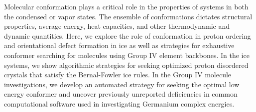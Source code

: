 Molecular conformation plays a critical role in the properties of systems in both the condensed or vapor states. 
The ensemble of conformations dictates structural properties, average energy, heat capacities, and other thermodynamic and dynamic quantities. 
Here, we explore the role of conformation in proton ordering and orientational defect formation in ice as well as strategies for exhaustive conformer searching for molecules using Group IV element backbones. 
In the ice systems, we show algorithmic strategies for seeking optimized proton disordered crystals that satisfy the Bernal-Fowler ice rules. 
In the Group IV molecule investigations, we develop an automated strategy for seeking the optimal low energy conformer and uncover previously unreported deficiencies in common computational software used in investigating Germanium complex energies.
